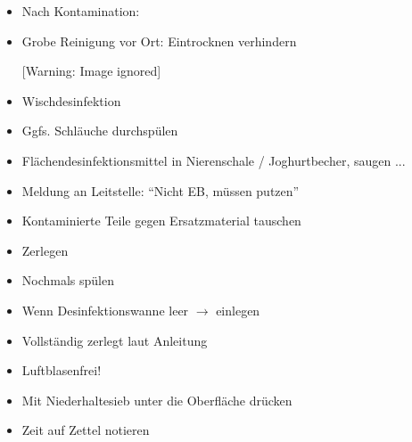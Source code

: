 \documentclass{article}
\makeatletter
\newcommand\captionof[1]{\def\@captype{#1}\caption}
\makeatother
\begin{document}
\begin{itemize}
\item Nach Kontamination:

\end{itemize}
\begin{itemize}
\item Grobe Reinigung vor Ort: Eintrocknen verhindern

\begin{center}
 [Warning: Image ignored] %
\captionof{figure}[Desinfektionswannen, verschiedene
Gr\"o{\ss}en]{Desinfektionswannen, verschiedene Gr\"o{\ss}en}

\end{center}
\end{itemize}
\begin{itemize}
\item Wischdesinfektion

\item Ggfs. Schl\"auche durchsp\"ulen

\item Fl\"achendesinfektionsmittel in Nierenschale / Joghurtbecher,
saugen ...

\end{itemize}
\begin{itemize}
\item Meldung an Leitstelle: {\textquotedblleft}Nicht EB, m\"ussen
putzen{\textquotedblright}

\item Kontaminierte Teile gegen Ersatzmaterial tauschen

\end{itemize}
\begin{itemize}
\item Zerlegen

\item Nochmals sp\"ulen

\end{itemize}
\begin{itemize}
\item Wenn Desinfektionswanne leer ${\rightarrow}$ einlegen 

\end{itemize}
\begin{itemize}
\item Vollst\"andig zerlegt laut Anleitung

\item Luftblasenfrei!

\item Mit Niederhaltesieb unter die Oberfl\"ache dr\"ucken

\item Zeit auf Zettel notieren 

\end{itemize}
\end{document}
